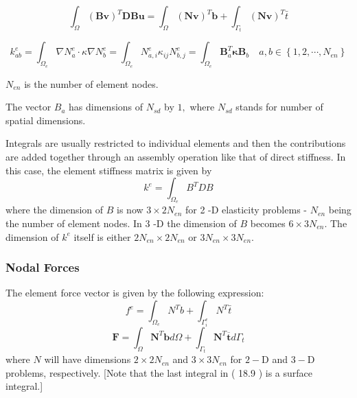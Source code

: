 \[\int_{\Omega}(\boldsymbol{B} \boldsymbol{v})^{T} \boldsymbol{D} \boldsymbol{B} \boldsymbol{u}=\int_{\Omega}(\boldsymbol{N} \boldsymbol{v})^{T} \boldsymbol{b}+\int_{\Gamma_{t}}(\boldsymbol{N} \boldsymbol{v})^{T} \bar{t}\]

\[k_{a b}^{e}=\int_{\Omega_{e}} \nabla N_{a}^{e} \cdot \kappa \nabla N_{b}^{e}=\int_{\Omega_{e}} N_{a, i}^{e} \kappa_{i j} N_{b, j}^{e} =\int_{\Omega_{e}} \boldsymbol{B}_{a}^{T} \boldsymbol{\kappa} \boldsymbol{B}_{b} \quad a, b \in\left\{1,2, \cdots, N_{e n}\right\}\]

\(N_{en}\) is the number of element nodes.

The vector \(B_{a}\) has dimensions of \(N_{s d}\) by \(1,\) where
\(N_{s d}\) stands for number of spatial dimensions.

Integrals are usually restricted to individual elements and then the
contributions are added together through an assembly operation like that
of direct stiffness. In this case, the element stiffness matrix is given
by \[
k^{e}=\int_{\Omega_{e}} B^{T} D B
\] where the dimension of \(B\) is now \(3 \times 2 N_{e n}\) for 2 -D
elasticity problems - \(N_{e n}\) being the number of element nodes. In
3 -D the dimension of \(B\) becomes \(6 \times 3 N_{e n}\). The
dimension of \(k^{e}\) itself is either \(2 N_{e n} \times 2 N_{e n}\)
or \(3 N_{e n} \times 3 N_{e n} .\)

\hypertarget{nodal-forces}{%
\subsubsection{Nodal Forces}\label{nodal-forces}}

The element force vector is given by the following expression: \[
f^{e}=\int_{\Omega_{e}} N^{T} b+\int_{\Gamma_{i}^{e}} N^{T} \bar{t}
\]
\[\boldsymbol{F}=\int_{\Omega} \boldsymbol{N}^{T} \boldsymbol{b} d \Omega+\int_{\Gamma_{t}} \boldsymbol{N}^{T} \overline{\boldsymbol{t}} d \Gamma_{t}\]
where \(N\) will have dimensions \(2 \times 2 N_{e n}\) and
\(3 \times 3 N_{e n}\) for \(2-\mathrm{D}\) and \(3-\mathrm{D}\)
problems, respectively. {[}Note that the last integral in ( 18.9 ) is a
surface integral.{]}

